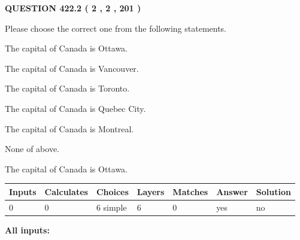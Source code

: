 \documentclass[12pt]{article}
\begin{document}
   
  
\vspace{0.2in}
  
{\textbf{\Large{QUESTION
422.2 
 ( 2 , 2 , 201 )
}}}
  
  
Please choose the correct one from the following statements.
 
 
The capital of Canada is Ottawa.
 
 
The capital of Canada is Vancouver.
 
 
The capital of Canada is Toronto.
 
 
The capital of Canada is Quebec City.
 
 
The capital of Canada is Montreal.
 
 
 None of above.
 
 
\noindent{}
 
 
The capital of Canada is Ottawa.
 
 
\noindent{}
 
 
   
   
   
   
\noindent\begin{tabular}{|l|l|l|l|l|l|l|}
 \hline
Inputs & Calculates & Choices & Layers & Matches & Answer & Solution \\ \hline
 0  & 
 0  & 
 6
  simple  
  & 
 6  & 
 0  & 
  yes & 
  no 
  \\ \hline
 \end{tabular}
   
   
   
   
\noindent{}
   
   
   
   
\noindent\vspace{0.1in}\hspace{-0.08in} {\textbf{\Large{All inputs: }}}
   
   
   
   
   
   
 \vspace{0.2in}
 
   
   
\end{document}
